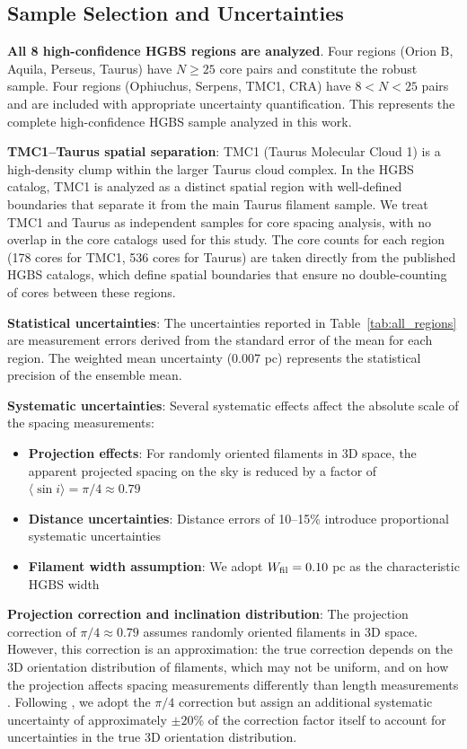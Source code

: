 \documentclass[11pt,a4paper]{article}
\begin{document}
\subsection{Sample Selection and Uncertainties}

\textbf{All 8 high-confidence HGBS regions are analyzed}. Four regions (Orion B, Aquila, Perseus, Taurus) have $N \geq 25$ core pairs and constitute the robust sample. Four regions (Ophiuchus, Serpens, TMC1, CRA) have $8 < N < 25$ pairs and are included with appropriate uncertainty quantification. This represents the complete high-confidence HGBS sample analyzed in this work.

\textbf{TMC1--Taurus spatial separation}: TMC1 (Taurus Molecular Cloud 1) is a high-density clump within the larger Taurus cloud complex. In the HGBS catalog, TMC1 is analyzed as a distinct spatial region with well-defined boundaries that separate it from the main Taurus filament sample. We treat TMC1 and Taurus as independent samples for core spacing analysis, with no overlap in the core catalogs used for this study. The core counts for each region (178 cores for TMC1, 536 cores for Taurus) are taken directly from the published HGBS catalogs, which define spatial boundaries that ensure no double-counting of cores between these regions.

\textbf{Statistical uncertainties}: The uncertainties reported in Table~\ref{tab:all_regions} are measurement errors derived from the standard error of the mean for each region. The weighted mean uncertainty (0.007 pc) represents the statistical precision of the ensemble mean.

\textbf{Systematic uncertainties}: Several systematic effects affect the absolute scale of the spacing measurements:
\begin{itemize}
    \item \textbf{Projection effects}: For randomly oriented filaments in 3D space, the apparent projected spacing on the sky is reduced by a factor of $\langle \sin i \rangle = \pi/4 \approx 0.79$
    \item \textbf{Distance uncertainties}: Distance errors of 10--15\% introduce proportional systematic uncertainties
    \item \textbf{Filament width assumption}: We adopt $W_{\rm fil} = 0.10$ pc as the characteristic HGBS width \citep{Arzoumanian2011}
\end{itemize}

\textbf{Projection correction and inclination distribution}: The projection correction of $\pi/4 \approx 0.79$ assumes randomly oriented filaments in 3D space. However, this correction is an approximation: the true correction depends on the 3D orientation distribution of filaments, which may not be uniform, and on how the projection affects spacing measurements differently than length measurements \citep{Arzoumanian2011}. Following \citet{Arzoumanian2011}, we adopt the $\pi/4$ correction but assign an additional systematic uncertainty of approximately $\pm20$\% of the correction factor itself to account for uncertainties in the true 3D orientation distribution.
\end{document}
